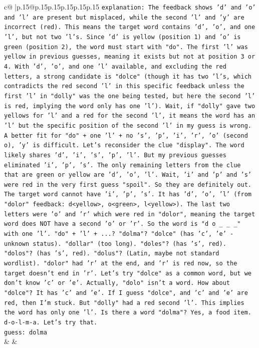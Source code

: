 \documentclass{article}
\begin{document}
{\begin{supertabular}{c@{$\;$}|p{.15\linewidth}@{}p{.15\linewidth}p{.15\linewidth}p{.15\linewidth}p{.15\linewidth}p{.15\linewidth}}
{{{                \texttt{explanation: The feedback shows 'd' and 'o' and 'l' are present but misplaced, while the second 'l' and 'y' are incorrect (red). This means the target word contains 'd', 'o', and one 'l', but not two 'l's. Since 'd' is yellow (position 1) and 'o' is green (position 2), the word must start with "do". The first 'l' was yellow in previous guesses, meaning it exists but not at position 3 or 4. With 'd', 'o', and one 'l' available, and excluding the red letters, a strong candidate is "dolce" (though it has two 'l's, which contradicts the red second 'l' in this specific feedback unless the first 'l' in "dolly" was the one being tested, but here the second 'l' is red, implying the word only has one 'l'). Wait, if "dolly" gave two yellows for 'l' and a red for the second 'l', it means the word has an 'l' but the specific position of the second 'l' in my guess is wrong. A better fit for "do" + one 'l' + no 's', 'p', 'i', 'r', 'o' (second o), 'y' is difficult. Let's reconsider the clue "display". The word likely shares 'd', 'i', 's', 'p', 'l'. But my previous guesses eliminated 'i', 'p', 's'. The only remaining letters from the clue that are green or yellow are 'd', 'o', 'l'. Wait, 'i' and 'p' and 's' were red in the very first guess "spoil". So they are definitely out. The target word cannot have 'i', 'p', 's'. It has 'd', 'o', 'l' (from "dolor" feedback: d<yellow>, o<green>, l<yellow>). The last two letters were 'o' and 'r' which were red in "dolor", meaning the target word does NOT have a second 'o' or 'r'. So the word is "d o \_ \_ \_" with one 'l'. "do" + 'l' + ...? "dolma"? "dolce" (has 'c', 'e' {-} unknown status). "dollar" (too long). "doles"? (has 's', red). "dolos"? (has 's', red). "dolus"? (Latin, maybe not standard wordlist). "dolor" had 'r' at the end, and 'r' is red now, so the target doesn't end in 'r'. Let's try "dolce" as a common word, but we don't know 'c' or 'e'. Actually, "dolo" isn't a word. How about "dolce"? It has 'c' and 'e'. If I guess "dolce", and 'c' and 'e' are red, then I'm stuck. But "dolly" had a red second 'l'. This implies the word has only one 'l'. Is there a word "dolma"? Yes, a food item. d{-}o{-}l{-}m{-}a. Let's try that.} \\
\texttt{guess: dolma} \\
            }
        }
    }
    & & \\ \\


\end{supertabular}}
\end{document}
